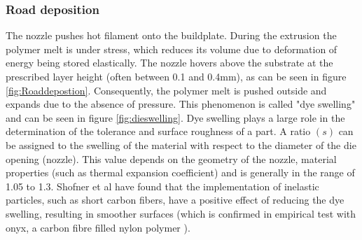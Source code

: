 \subsubsection{Road deposition}
    \label{Road deposition}
The nozzle pushes hot filament onto the buildplate. During the extrusion the polymer melt is under stress, which reduces its volume due to deformation of energy being stored elastically. The nozzle hovers above the substrate at the prescribed layer height (often between 0.1 and 0.4mm), as can be seen in figure \ref{fig:Roaddepostion}. Consequently, the polymer melt is pushed outside and expands due to the absence of pressure. This phenomenon is called "dye swelling" and can be seen in figure \ref{fig:dieswelling}. Dye swelling plays a large role in the determination of the tolerance and surface roughness of a part. A ratio $(s)$ can be assigned to the swelling of the material with respect to the diameter of the die opening (nozzle). This value depends on the geometry of the nozzle, material properties (such as thermal expansion coefficient) and is generally in the range of 1.05 to 1.3. Shofner et al\cite{Turner2014AModeling} have found that the implementation of inelastic particles, such as short carbon fibers, have a positive effect of reducing the dye swelling, resulting in smoother surfaces (which is confirmed in empirical test with onyx, a carbon fibre filled nylon polymer \cite{TNO2017ProcesbegeleidingLearned}). 



